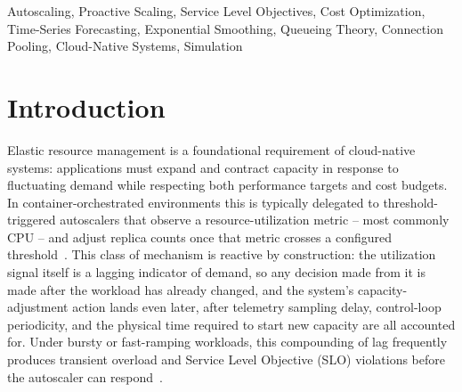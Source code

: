 \documentclass[conference]{IEEEtran}
\begin{document}
\begin{abstract}
disappears at the originally hand-picked (uncalibrated) damping factor -- a finding we consider more
informative than a single flattering headline number. We additionally report, as a distinct
contribution, a direct accuracy evaluation of the forecasting layer against four classical baselines
(naive persistence, simple moving average, linear drift, and Holt alone): RAM utilization is forecast
most accurately (96.2\%, $100-\mathrm{SMAPE}/2$, $R^2=0.53$), CPU and connection-pool utilization at
81.6\%/88.3\%, and p99 latency at 82.3\% -- and find that for the two most heavy-tailed signals (p99
latency, connection-pool utilization), naive persistence alone remains a stronger point forecaster than
any trend-extrapolating model we evaluate, even though the same forecasts remain useful for the
practically relevant, and previously unreported, question of whether an SLO breach will occur
\emph{at some point} within the forecast horizon (windowed classification F1 rises from
$\approx$0.16 under a strict point-in-time definition to 0.36 (this paper's forecaster) and 0.43
(persistence) once framed this way, and to 0.45 at the best achievable decision threshold). All
workload-generation parameters are disclosed in full in the source code -- no private or otherwise
unreleasable data was used to produce them -- and all code, the statistical evaluation harness, and an
interactive Node.js dashboard are structured for reproducibility, requiring no cluster, container
orchestrator, or cloud account to run.
\end{abstract}

\begin{IEEEkeywords}
Autoscaling, Proactive Scaling, Service Level Objectives, Cost Optimization, Time-Series Forecasting,
Exponential Smoothing, Queueing Theory, Connection Pooling, Cloud-Native Systems, Simulation
\end{IEEEkeywords}

\section{Introduction}

Elastic resource management is a foundational requirement of cloud-native systems: applications must
expand and contract capacity in response to fluctuating demand while respecting both performance
targets and cost budgets. In container-orchestrated environments this is typically delegated to
threshold-triggered autoscalers that observe a resource-utilization metric -- most commonly CPU -- and
adjust replica counts once that metric crosses a configured threshold~\cite{ref1}. This class of
mechanism is reactive by construction: the utilization signal itself is a lagging indicator of demand,
so any decision made from it is made after the workload has already changed, and the system's
capacity-adjustment action lands even later, after telemetry sampling delay, control-loop
periodicity, and the physical time required to start new capacity are all accounted for. Under bursty
or fast-ramping workloads, this compounding of lag frequently produces transient overload and Service
Level Objective (SLO) violations before the autoscaler can respond~\cite{ref3}.
\end{document}
